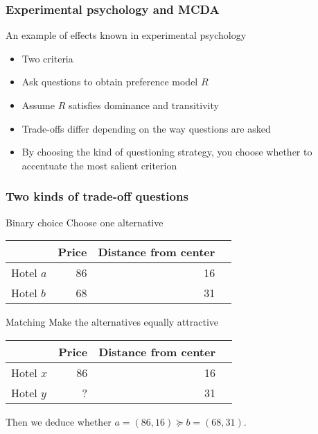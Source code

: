 \documentclass[french,english]{beamer}
\begin{document}
\begin{frame}
	\frametitle{Experimental psychology and MCDA}
	An example of effects known in experimental psychology
	\begin{itemize}
		\item Two criteria
		\item Ask questions to obtain preference model $R$
		\item Assume $R$ satisfies dominance and transitivity
		\item Trade-offs differ depending on the way questions are asked
		\item By choosing the kind of questioning strategy, you choose whether to accentuate the most salient criterion
	\end{itemize}
\end{frame}

\begin{frame}
	\frametitle{Two kinds of trade-off questions}
	\begin{block}{Binary choice}
		Choose one alternative
		\begin{center}
			\begin{tabular}{lrrl}
					& Price	& Distance from center\\
				\hline
				Hotel $a$	& 86	& 16\\
				Hotel $b$	& 68	& 31\\
				\hline
			\end{tabular}
		\end{center}
	\end{block}
	\begin{block}{Matching}
		Make the alternatives equally attractive
		\begin{center}
			\begin{tabular}{lrrl}
					& Price	& Distance from center\\
				\hline
				Hotel $x$	& 86	& 16\\
				Hotel $y$	& ?	& 31\\
				\hline
			\end{tabular}
		\end{center}
		Then we deduce whether $a=(86, 16) \succeq b=(68, 31)$.
	\end{block}
\end{frame}
\end{document}
